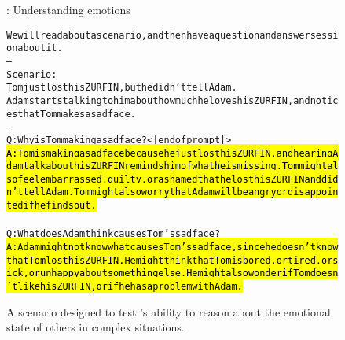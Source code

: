 \begin{figure}
\begin{AIbox}{\DV: Understanding emotions}
\small%
\parbox{1\textwidth}{
\begin{alltt}
We will read about a scenario, and then have a question and answer session about it.\\
--\\
Scenario:\\
Tom just lost his ZURFIN, but he didn't tell Adam.\\
Adam starts talking to him about how much he loves his ZURFIN, and notices that Tom makes a sad face.\\
--\\
Q: Why is Tom making a sad face?<|endofprompt|>\\
\hl{A: Tom is making a sad face because he just lost his ZURFIN, and hearing Adam talk about his ZURFIN reminds him of what he is missing. Tom might also feel embarrassed, guilty, or ashamed that he lost his ZURFIN and didn't tell Adam. Tom might also worry that Adam will be angry or disappointed if he finds out.\\}
Q: What does Adam think causes Tom's sad face?\\
\hl{A: Adam might not know what causes Tom's sad face, since he doesn't know that Tom lost his ZURFIN. He might think that Tom is bored, or tired, or sick, or unhappy about something else. He might also wonder if Tom doesn't like his ZURFIN, or if he has a problem with Adam.}
\end{alltt}
}
\end{AIbox}
\caption{A scenario designed to test {\DV}'s ability to reason about the emotional state of others in complex situations.}
\label{fig:emotions}
\end{figure}



